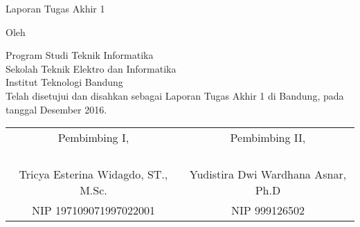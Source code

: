\clearpage
\pagestyle{empty}

\begin{center}
\smallskip

    \Large \bfseries \MakeUppercase{\thetitle}
    \vfill

    \Large Laporan Tugas Akhir 1
    \vfill

    \large Oleh

    \Large \theauthor

    \large Program Studi Teknik Informatika \\
    Sekolah Teknik Elektro dan Informatika \\
    Institut Teknologi Bandung \\

    \vfill
    \normalsize \normalfont
    Telah disetujui dan disahkan sebagai Laporan Tugas Akhir 1 di Bandung, pada tanggal     Desember 2016.

    \vfill
    \setlength{\tabcolsep}{12pt}
    \begin{tabular}{c@{\hskip 0.5in}c}
        Pembimbing I, & Pembimbing II, \\
        & \\
        & \\
        & \\
        & \\
        Tricya Esterina Widagdo, ST., M.Sc. & Yudistira Dwi Wardhana Asnar, Ph.D \\
        NIP 197109071997022001 & NIP 999126502 \\
    \end{tabular}

\end{center}
\clearpage
